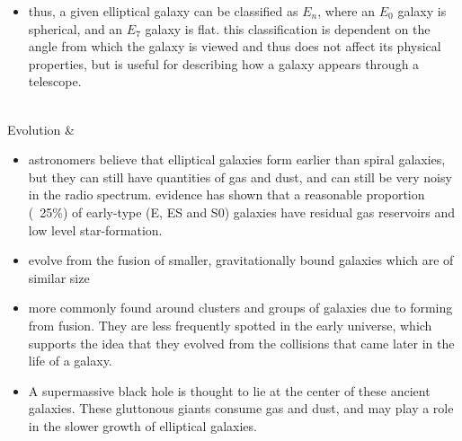 \begin{longtabu}
\begin{itemize}[noitemsep]
		\item thus, a given elliptical galaxy can be classified as $E_{n}$, where an $E_0$ galaxy is spherical, and an $E_7$ galaxy is flat. this classification is dependent on the angle from which the galaxy is viewed and thus does not affect its physical properties, but is useful for describing how a galaxy appears through a telescope.
	\end{itemize}
	\\
	\hline
	Evolution &
	\begin{itemize}[noitemsep]
		\item astronomers believe that elliptical galaxies form earlier than spiral galaxies, but they can still have quantities of gas and dust, and can still be very noisy in the radio spectrum. evidence has shown that a reasonable proportion (~25\%) of early-type (E, ES and S0) galaxies have residual gas reservoirs and low level star-formation.
		\item evolve from the fusion of smaller, gravitationally bound galaxies which are of similar size
		\item more commonly found around clusters and groups of galaxies due to forming from fusion. They are less frequently spotted in the early universe, which supports the idea that they evolved from the collisions that came later in the life of a galaxy.
		\item A supermassive black hole is thought to lie at the center of these ancient galaxies. These gluttonous giants consume gas and dust, and may play a role in the slower growth of elliptical galaxies.
	\end{itemize}
	\\
	\hline
\end{longtabu}

